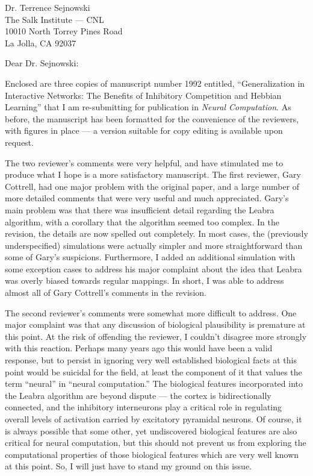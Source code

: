 \documentclass [11pt]{letter}
\begin{document}
\begin{letter}
{Dr. Terrence Sejnowski\\
The Salk Institute --- CNL\\
10010 North Torrey Pines Road\\
La Jolla, CA 92037\\}

\opening{Dear Dr. Sejnowski:}

Enclosed are three copies of manuscript number 1992 entitled,
``Generalization in Interactive Networks: The Benefits of Inhibitory
Competition and Hebbian Learning'' that I am re-submitting for
publication in {\em Neural Computation}.  As before, the manuscript
has been formatted for the convenience of the reviewers, with figures
in place --- a version suitable for copy editing is available upon
request.

The two reviewer's comments were very helpful, and have stimulated me
to produce what I hope is a more satisfactory manuscript.  The first
reviewer, Gary Cottrell, had one major problem with the original
paper, and a large number of more detailed comments that were very
useful and much appreciated.  Gary's main problem was that there was
insufficient detail regarding the Leabra algorithm, with a corollary
that the algorithm seemed too complex.  In the revision, the details
are now spelled out completely.  In most cases, the (previously
underspecified) simulations were actually simpler and more
straightforward than some of Gary's suspicions.  Furthermore, I added
an additional simulation with some exception cases to address his
major complaint about the idea that Leabra was overly biased towards
regular mappings.  In short, I was able to address almost all of Gary
Cottrell's comments in the revision.

The second reviewer's comments were somewhat more difficult to
address.  One major complaint was that any discussion of biological
plausibility is premature at this point.  At the risk of offending the
reviewer, I couldn't disagree more strongly with this reaction.
Perhaps many years ago this would have been a valid response, but to
persist in ignoring very well established biological facts at this
point would be suicidal for the field, at least the component of it
that values the term ``neural'' in ``neural computation.''  The
biological features incorporated into the Leabra algorithm are beyond
dispute --- the cortex is bidirectionally connected, and the
inhibitory interneurons play a critical role in regulating overall
levels of activation carried by excitatory pyramidal neurons.  Of
course, it is always possible that some other, yet undiscovered
biological features are also critical for neural computation, but this
should not prevent us from exploring the computational properties of
those biological features which are very well known at this point.
So, I will just have to stand my ground on this issue.


\end{letter}
\end{document}
